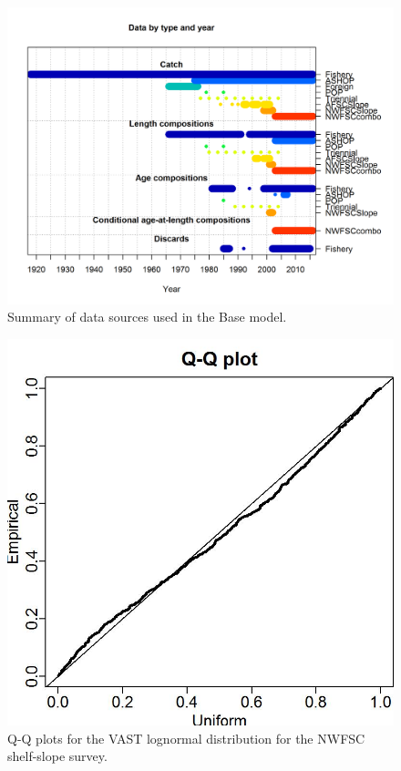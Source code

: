 \documentclass[12pt,]{article}
\begin{document}
\FloatBarrier

\begin{figure}
\centering
\includegraphics{r4ss/plots_mod1/data_plot.png}
\caption{Summary of data sources used in the Base model.
\label{fig:data_plot}}
\end{figure}

\FloatBarrier

\begin{figure}
\centering
\includegraphics{Figures/Q-Q_plot_combo.jpg}
\caption{Q-Q plots for the VAST lognormal distribution for the NWFSC
shelf-slope survey. \label{fig:nw_qq}}
\end{figure}
\end{document}
